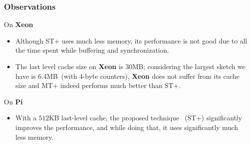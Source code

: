 \documentclass{beamer}
\begin{document}
\begin{frame}
	\frametitle{Observations}
	On {\bf Xeon}
	\begin{itemize}
		\item Although ST+ uses much less memory, its performance is not good due to all the time spent while buffering and synchronization.
		\item The last level cache size on  {\bf Xeon} is 30MB; considering the largest sketch we have is 6.4MB~(with 4-byte counters), {\bf Xeon} does not suffer from its cache size and MT+ indeed performs much better than ST+.
	\end{itemize}
	On {\bf Pi}
	\begin{itemize}
		\item With a $512$KB last-level cache, the proposed technique ~(ST+) significantly improves the performance, and while doing that, it uses significantly much less memory.
	\end{itemize}

\end{frame}
\end{document}
